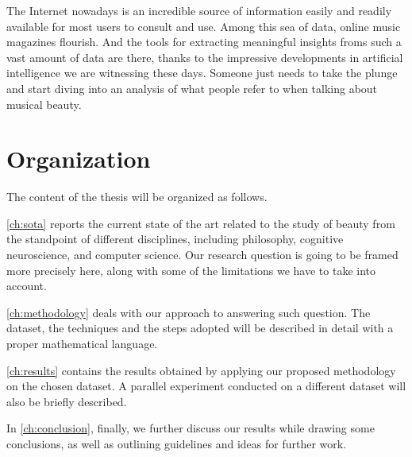 The Internet nowadays is an incredible source of information easily and readily available for most users to consult and use. Among this sea of data, online music magazines flourish. And the tools for extracting meaningful insights froms such a vast amount of data are there, thanks to the impressive developments in artificial intelligence we are witnessing these days. Someone just needs to take the plunge and start diving into an analysis of what people refer to when talking about musical beauty.

\section{Organization}
The content of the thesis will be organized as follows.

\autoref{ch:sota} reports the current state of the art related to the study of beauty from the standpoint of different disciplines, including philosophy, cognitive neuroscience, and computer science. Our research question is going to be framed more precisely here, along with some of the limitations we have to take into account.

\autoref{ch:methodology} deals with our approach to answering such question. The dataset, the techniques and the steps adopted will be described in detail with a proper mathematical language.

\autoref{ch:results} contains the results obtained by applying our proposed methodology on the chosen dataset. A parallel experiment conducted on a different dataset will also be briefly described.

In \autoref{ch:conclusion}, finally, we further discuss our results while drawing some conclusions, as well as outlining guidelines and ideas for further work.
